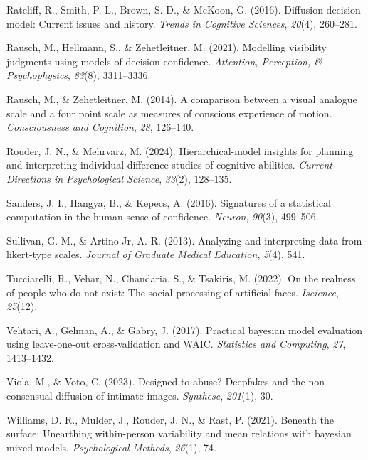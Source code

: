 \documentclass[
  jou,
  floatsintext,
  longtable,
  nolmodern,
  notxfonts,
  notimes,
  colorlinks=true,linkcolor=blue,citecolor=blue,urlcolor=blue]{apa7}
\newlength{\cslhangindent}
\newenvironment{CSLReferences}[2] %
 {\begin{list}{}{%
  \setlength{\itemindent}{0pt}
  \setlength{\leftmargin}{0pt}
  \setlength{\parsep}{0pt}
  \ifodd #1
   \setlength{\leftmargin}{\cslhangindent}
   \setlength{\itemindent}{-1\cslhangindent}
  \fi
  \setlength{\itemsep}{#2\baselineskip}}}
 {\end{list}}
\begin{document}
\begin{CSLReferences}{1}{0}
Ratcliff, R., Smith, P. L., Brown, S. D., \& McKoon, G. (2016).
Diffusion decision model: Current issues and history. \emph{Trends in
Cognitive Sciences}, \emph{20}(4), 260--281.

Rausch, M., Hellmann, S., \& Zehetleitner, M. (2021). Modelling
visibility judgments using models of decision confidence.
\emph{Attention, Perception, \& Psychophysics}, \emph{83}(8),
3311--3336.

Rausch, M., \& Zehetleitner, M. (2014). A comparison between a visual
analogue scale and a four point scale as measures of conscious
experience of motion. \emph{Consciousness and Cognition}, \emph{28},
126--140.

Rouder, J. N., \& Mehrvarz, M. (2024). Hierarchical-model insights for
planning and interpreting individual-difference studies of cognitive
abilities. \emph{Current Directions in Psychological Science},
\emph{33}(2), 128--135.

Sanders, J. I., Hangya, B., \& Kepecs, A. (2016). Signatures of a
statistical computation in the human sense of confidence. \emph{Neuron},
\emph{90}(3), 499--506.

Sullivan, G. M., \& Artino Jr, A. R. (2013). Analyzing and interpreting
data from likert-type scales. \emph{Journal of Graduate Medical
Education}, \emph{5}(4), 541.

Tucciarelli, R., Vehar, N., Chandaria, S., \& Tsakiris, M. (2022). On
the realness of people who do not exist: The social processing of
artificial faces. \emph{Iscience}, \emph{25}(12).

Vehtari, A., Gelman, A., \& Gabry, J. (2017). Practical bayesian model
evaluation using leave-one-out cross-validation and WAIC.
\emph{Statistics and Computing}, \emph{27}, 1413--1432.

Viola, M., \& Voto, C. (2023). Designed to abuse? Deepfakes and the
non-consensual diffusion of intimate images. \emph{Synthese},
\emph{201}(1), 30.

Williams, D. R., Mulder, J., Rouder, J. N., \& Rast, P. (2021). Beneath
the surface: Unearthing within-person variability and mean relations
with bayesian mixed models. \emph{Psychological Methods}, \emph{26}(1),
74.

\end{CSLReferences}
\end{document}
